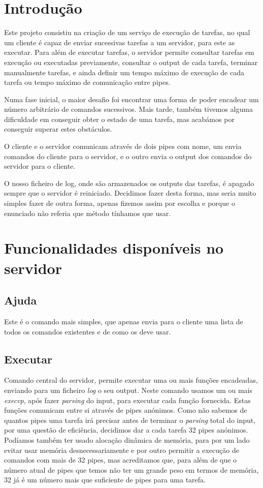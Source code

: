 \documentclass[a4paper]{report}
\begin{document}
	\tableofcontents
	
	\pagebreak
	
	\chapter{Introdução}
%	
	Este projeto consistiu na criação de um serviço de execução de tarefas, no qual um cliente é capaz de enviar sucessivas tarefas a um servidor, para este as executar.
	Para além de executar tarefas, o servidor permite consultar tarefas em execução ou executadas previamente, consultar o output de cada tarefa, terminar manualmente tarefas, e ainda definir um tempo máximo de execução de cada tarefa ou tempo máximo de comunicação entre pipes.
	
	Numa fase inicial, o maior desafio foi encontrar uma forma de poder encadear um número arbitrário de comandos sucessivos. Mais tarde, também tivemos alguma dificuldade em conseguir obter o estado de uma tarefa, mas acabámos por conseguir superar estes obstáculos.
	
	O cliente e o servidor comunicam através de dois pipes com nome, um envia comandos do cliente para o servidor, e o outro envia o output dos comandos do servidor para o cliente.
	
	O nosso ficheiro de log, onde são armazenados os outputs das tarefas, é apagado sempre que o servidor é reiniciado. Decidimos fazer desta forma, mas seria muito simples fazer de outra forma, apenas fizemos assim por escolha e porque o enunciado não referia que método tínhamos que usar.
	
	\chapter{Funcionalidades disponíveis no servidor}
	\section{Ajuda}
	Este é o comando mais simples, que apenas envia para o cliente uma lista de todos os comandos existentes e de como os deve usar.
	
	\section{Executar}
	Comando central do servidor, permite executar uma ou mais funções encadeadas, enviando para um ficheiro \emph{log} o seu output. Neste comando usamos um ou mais \emph{execvp}, após fazer \textit{parsing} do input, para executar cada função fornecida. Estas funções comunicam entre si através de pipes anónimos. Como não sabemos de quantos pipes uma tarefa irá precisar antes de terminar o \textit{parsing} total do input, por uma questão de eficiência, decidimos dar a cada tarefa 32 pipes anónimos. Podíamos também ter usado alocação dinâmica de memória, para por um lado evitar usar memória desnecessariamente e por outro permitir a execução de comandos com mais de 32 pipes, mas acreditamos que, para além de que o número atual de pipes que temos não ter um grande peso em termos de memória, 32 já é um número mais que suficiente de pipes para uma tarefa.
\end{document}
